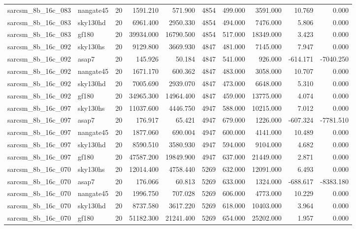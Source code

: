 \begin{tabular}{llrrrrrrrr}
sarcsm\_8b\_16c\_083 & nangate45 & 20 & 1591.210 & 571.900 & 4854 & 499.000 & 3591.000 & 10.769 & 0.000 \\
sarcsm\_8b\_16c\_083 & sky130hd & 20 & 6961.400 & 2950.330 & 4854 & 494.000 & 7476.000 & 5.806 & 0.000 \\
sarcsm\_8b\_16c\_083 & gf180 & 20 & 39934.000 & 16790.500 & 4854 & 517.000 & 18349.000 & 3.423 & 0.000 \\
sarcsm\_8b\_16c\_092 & sky130hs & 20 & 9129.800 & 3669.930 & 4847 & 481.000 & 7145.000 & 7.947 & 0.000 \\
sarcsm\_8b\_16c\_092 & asap7 & 20 & 145.926 & 50.184 & 4847 & 541.000 & 926.000 & -614.171 & -7040.250 \\
sarcsm\_8b\_16c\_092 & nangate45 & 20 & 1671.170 & 600.362 & 4847 & 483.000 & 3058.000 & 10.707 & 0.000 \\
sarcsm\_8b\_16c\_092 & sky130hd & 20 & 7005.690 & 2939.070 & 4847 & 473.000 & 6648.000 & 5.310 & 0.000 \\
sarcsm\_8b\_16c\_092 & gf180 & 20 & 34965.300 & 14964.400 & 4847 & 459.000 & 13775.000 & 4.074 & 0.000 \\
sarcsm\_8b\_16c\_097 & sky130hs & 20 & 11037.600 & 4446.750 & 4947 & 588.000 & 10215.000 & 7.012 & 0.000 \\
sarcsm\_8b\_16c\_097 & asap7 & 20 & 176.917 & 65.421 & 4947 & 679.000 & 1226.000 & -607.324 & -7781.510 \\
sarcsm\_8b\_16c\_097 & nangate45 & 20 & 1877.060 & 690.004 & 4947 & 600.000 & 4141.000 & 10.489 & 0.000 \\
sarcsm\_8b\_16c\_097 & sky130hd & 20 & 8590.510 & 3580.930 & 4947 & 594.000 & 9104.000 & 4.682 & 0.000 \\
sarcsm\_8b\_16c\_097 & gf180 & 20 & 47587.200 & 19849.900 & 4947 & 637.000 & 21449.000 & 2.871 & 0.000 \\
sarcsm\_8b\_16c\_070 & sky130hs & 20 & 12014.400 & 4758.440 & 5269 & 632.000 & 12091.000 & 6.493 & 0.000 \\
sarcsm\_8b\_16c\_070 & asap7 & 20 & 176.066 & 60.813 & 5269 & 633.000 & 1324.000 & -688.617 & -8383.180 \\
sarcsm\_8b\_16c\_070 & nangate45 & 20 & 1996.750 & 707.028 & 5269 & 606.000 & 4773.000 & 10.229 & 0.000 \\
sarcsm\_8b\_16c\_070 & sky130hd & 20 & 8737.580 & 3617.220 & 5269 & 618.000 & 10403.000 & 3.964 & 0.000 \\
sarcsm\_8b\_16c\_070 & gf180 & 20 & 51182.300 & 21241.400 & 5269 & 654.000 & 25202.000 & 1.957 & 0.000 \\

\end{tabular}
